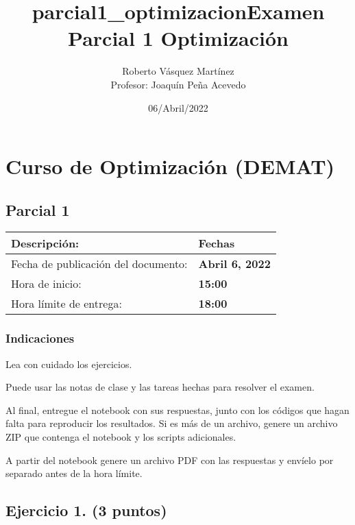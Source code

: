 \documentclass[11pt]{article}
\title{parcial1\_optimizacion}
\begin{document}
    
\title{Examen Parcial 1 Optimización}
\author{Roberto Vásquez Martínez \\ Profesor: Joaquín Peña Acevedo}
\date{06/Abril/2022}
\maketitle  
    
    

    
    \hypertarget{curso-de-optimizaciuxf3n-demat}{%
\section{Curso de Optimización
(DEMAT)}\label{curso-de-optimizaciuxf3n-demat}}

\hypertarget{parcial-1}{%
\subsection{Parcial 1}\label{parcial-1}}

\begin{longtable}[]{@{}ll@{}}
\toprule
Descripción: & Fechas \\
\midrule
\endhead
Fecha de publicación del documento: & \textbf{Abril 6, 2022} \\
Hora de inicio: & \textbf{15:00} \\
Hora límite de entrega: & \textbf{18:00} \\
\bottomrule
\end{longtable}

\hypertarget{indicaciones}{%
\subsubsection{Indicaciones}\label{indicaciones}}

Lea con cuidado los ejercicios.

Puede usar las notas de clase y las tareas hechas para resolver el
examen.

Al final, entregue el notebook con sus respuestas, junto con los códigos
que hagan falta para reproducir los resultados. Si es más de un archivo,
genere un archivo ZIP que contenga el notebook y los scripts
adicionales.

A partir del notebook genere un archivo PDF con las respuestas y envíelo
por separado antes de la hora límite.

    \hypertarget{ejercicio-1.-3-puntos}{%
\subsection{Ejercicio 1. (3 puntos)}\label{ejercicio-1.-3-puntos}}
\end{document}
